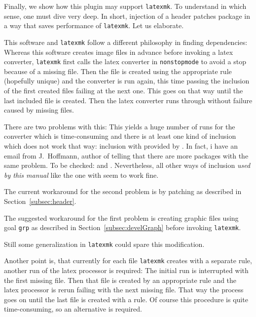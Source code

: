 Finally, we show how this plugin may support \texttt{latexmk}. 
To understand in which sense, one must dive very deep. 
In short, injection of a header patches package  
in a way that saves performance of \texttt{latexmk}. 
Let us elaborate. 

This software and \texttt{latexmk} follow a different philosophy in finding dependencies: 
Whereas this software creates image files in advance before invoking a latex converter, 
\texttt{latexmk} first calls the latex converter in \texttt{nonstopmode} 
to avoid a stop because of a missing file. 
Then the file is created using the appropriate rule (hopefully unique) 
and the converter is run again, 
this time passing the inclusion of the first created files 
failing at the next one. 
This goes on that way until the last included file is created. 
Then the latex converter runs through without failure caused by missing files. 

There are two problems with this: 
This yields a huge number of runs for the converter 
which is time-consuming 
and there is at least one kind of inclusion which does not work that way: 
inclusion with  
provided by . 
In fact, i have an email from J.~Hoffmann, author of  
telling that there are more packages with the same problem. 
To be checked:  and . 
Nevertheless, all other ways of inclusion \emph{used by this manual} 
like the one with  seem to work fine. 

The current workaround for the second problem 
is by patching  as described in Section~\ref{subsec:header}.

The suggested workaround for the first problem is 
creating graphic files using goal \texttt{grp} as described in Section~\ref{subsec:develGraph} 
before invoking \texttt{latexmk}. 

Still some generalization in \texttt{latexmk} could spare this modification. 

Another point is, that currently for each file \texttt{latexmk} creates with a separate rule, 
another run of the latex processor is required: 
The initial run is interrupted with the first missing file. 
Then that file is created by an appropriate rule and the latex processor is rerun 
failing with the next missing file. 
That way the process goes on until the last file is created with a rule. 
Of course this procedure is quite time-consuming, so an alternative is required. 



